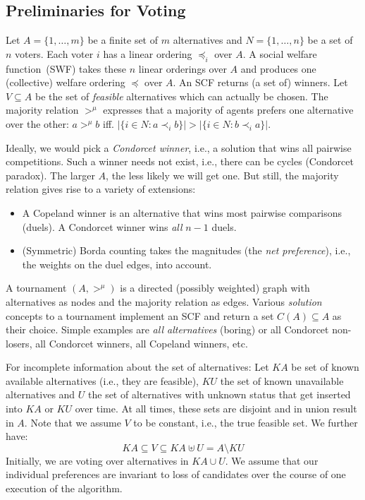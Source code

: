 \documentclass[10pt,a4paper,fleqn]{article}
\begin{document}
\subsection{Preliminaries for Voting}
Let $A = \{1, \ldots, m\}$ be a finite set of $m$ alternatives and $N = \{1, \ldots, n\}$ be
a set of $n$ voters. Each voter $i$ has a linear ordering $\preceq_i$ over $A$.
A social welfare function~(SWF) takes these $n$ linear orderings over $A$ and produces
one (collective) welfare ordering $\preceq$ over $A$. An SCF returns (a set of) winners.
Let $V \subseteq A$ be the set of \emph{feasible} alternatives which can actually be chosen.
The majority relation ${>^{\mu}}$ expresses that a majority of agents prefers one alternative over 
the other: $a >^\mu b$ iff. $|\{i \in N : a \prec_i b\}| > |\{i \in N : b \prec_i a\}|$.

Ideally, we would pick a \emph{Condorcet winner}, i.e., a solution that wins all pairwise competitions.
Such a winner needs not exist, i.e., there can be cycles (Condorcet paradox). The larger $A$, the less likely
we will get one. But still, the majority relation gives rise to a variety of extensions:
\begin{itemize}
\item A Copeland winner is an alternative that wins most pairwise comparisons (duels). A Condorcet winner
wins \emph{all} $n-1$ duels.
\item (Symmetric) Borda counting takes the magnitudes (the \emph{net preference}), i.e., the weights on the duel edges,
into account.
\end{itemize}
A tournament $(A, >^\mu)$ is a directed (possibly weighted) graph with alternatives as nodes and the majority relation
as edges. Various \emph{solution} concepts to a tournament implement an SCF and return a set $C(A) \subseteq A$ as their choice.
Simple examples are \emph{all alternatives} (boring) or all Condorcet non-losers, all Condorcet winners, all Copeland winners, etc.

For incomplete information about the set of alternatives: Let $\mathit{KA}$ be set of
known available alternatives (i.e., they are feasible), $\mathit{KU}$ the set of known unavailable alternatives
and $U$ the set of alternatives with unknown status that get inserted into $\mathit{KA}$ or $\mathit{KU}$ over time.
At all times, these sets are disjoint and in union result in $A$.
Note that we assume $V$ to be constant, i.e., the true feasible set.
 We further have:
\[
\mathit{KA} \subseteq V \subseteq \mathit{KA} \uplus U = A \setminus \mathit{KU}
\]
Initially, we are voting over alternatives in $\mathit{KA} \cup U$. We assume that 
our individual preferences are invariant to loss of candidates over the course 
of one execution of the algorithm.
\end{document}
